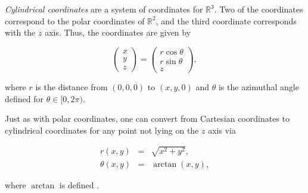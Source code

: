 \documentclass[12pt]{article}
\begin{document}
\emph{Cylindrical coordinates} are a system of coordinates for $\mathbb{R}^3$.  Two of the coordinates correspond to the polar coordinates of $\mathbb{R}^2$, and the third coordinate corresponds with the $z$ axis.  Thus, the coordinates are given by

$$\left( \begin{array}{c}
x \\
y \\
z \end{array} \right)=\left( \begin{array}{c}
r \cos \theta \\
r \sin \theta \\
z \end{array} \right),$$

where $r$ is the distance from $(0,0,0)$ to $(x,y,0)$ and $\theta$ is the azimuthal angle defined for $\theta \in [0,2\pi )$.

Just as with polar coordinates, one can convert from Cartesian coordinates to cylindrical coordinates for any point not lying on the $z$ axis via

\begin{eqnarray*}
r(x,y) &=& \sqrt{x^2+ y^2}, \\
\theta(x,y) &=& \arctan (x,y),
\end{eqnarray*}

where $\arctan$ is defined .
\end{document}
